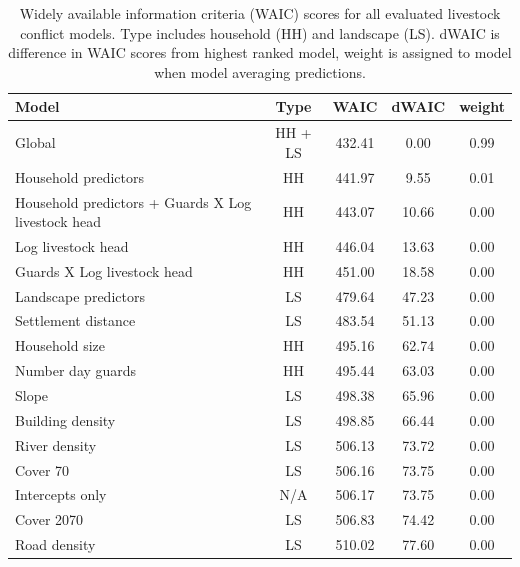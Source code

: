 \documentclass[12pt,]{article}
\begin{document}
\begin{table}[H]
\centering
\footnotesize
\caption{Widely available information criteria (WAIC) scores for all evaluated livestock conflict models. Type includes household (HH) and landscape (LS). dWAIC is difference in WAIC scores from highest ranked model, weight is assigned to model when model averaging predictions.}
\begin{tabular}{lcccc}
\hline
\textbf{Model}                                     & \textbf{Type} & \textbf{WAIC} & \textbf{dWAIC} & \textbf{weight} \\ \hline
Global                                             & HH + LS       & 432.41        & 0.00           & 0.99            \\
Household predictors                               & HH            & 441.97        & 9.55           & 0.01            \\
Household predictors + Guards X Log livestock head & HH            & 443.07        & 10.66          & 0.00            \\
Log livestock head                                 & HH            & 446.04        & 13.63          & 0.00            \\
Guards X Log livestock head                        & HH            & 451.00        & 18.58          & 0.00            \\
Landscape predictors                               & LS            & 479.64        & 47.23          & 0.00            \\
Settlement distance                                & LS            & 483.54        & 51.13          & 0.00            \\
Household size                                     & HH            & 495.16        & 62.74          & 0.00            \\
Number day guards                                  & HH            & 495.44        & 63.03          & 0.00            \\
Slope                                              & LS            & 498.38        & 65.96          & 0.00            \\
Building density                                   & LS            & 498.85        & 66.44          & 0.00            \\
River density                                      & LS            & 506.13        & 73.72          & 0.00            \\
Cover 70                                           & LS            & 506.16        & 73.75          & 0.00            \\
Intercepts only                                    & N/A           & 506.17        & 73.75          & 0.00            \\
Cover 2070                                         & LS            & 506.83        & 74.42          & 0.00            \\
Road density                                       & LS            & 510.02        & 77.60          & 0.00           
\end{tabular}

\label{tab:WAIClivestocknods}
\end{table}
\end{document}
